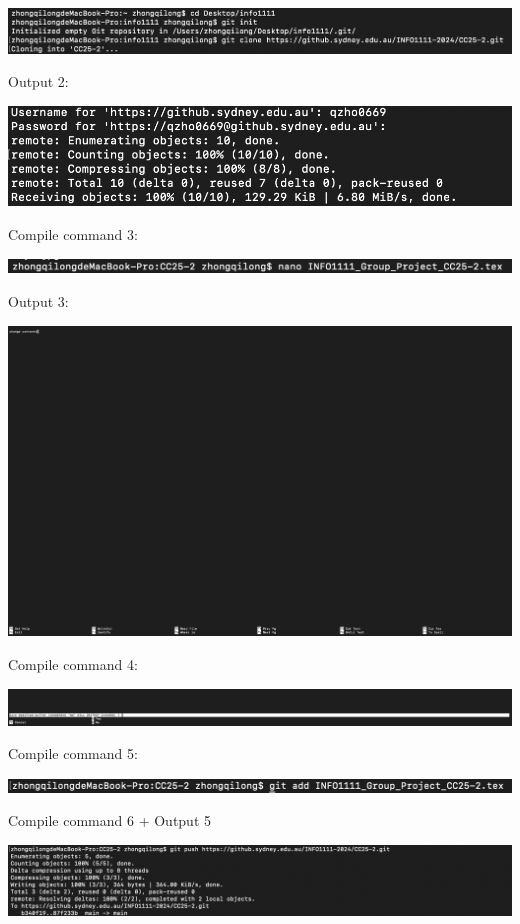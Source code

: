 \documentclass[a4paper, 11pt]{report}
\begin{document}
\includegraphics[scale=0.5]{Pasted Graphic}

Output 2:

\includegraphics[scale=0.5]{Pasted Graphic 1}

Compile command 3:

\includegraphics[scale=0.5]{Pasted Graphic 2}

Output 3:

\includegraphics[scale=0.2]{Pasted Graphic 5}

Compile command 4:

\includegraphics[scale=0.25]{Pasted Graphic 6}

Compile command 5:

\includegraphics[scale=0.55]{Pasted Graphic 3}

Compile command 6 + Output 5

\includegraphics[scale=0.4]{Pasted Graphic 4}
\end{document}
